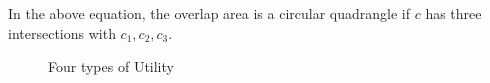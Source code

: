 \documentclass[a4paper,fleqn]{cas-dc}
\begin{document}
In the above equation, the overlap area is a circular quadrangle if $c$ has three intersections with $c_1,c_2,c_3$.  
\begin{figure}
\centering
    \newline
    \caption{  Four types of Utility}
    \label{fig:foo}
\end{figure}
\end{document}

